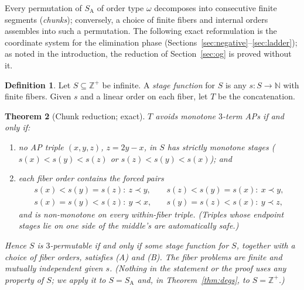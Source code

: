 \documentclass[11pt]{article}
\newtheorem{theorem}{Theorem}
\theoremstyle{definition}
\newtheorem{definition}[theorem]{Definition}
\newcommand{\Z}{\mathbb{Z}}
\newcommand{\N}{\mathbb{N}}
\newcommand{\SA}{S_{\mathrm{A}}}
\begin{document}
Every permutation of $\SA$ of order type $\omega$ decomposes into consecutive
finite segments (\emph{chunks}); conversely, a choice of finite fibers and
internal orders assembles into such a permutation. The following exact
reformulation is the coordinate system for the elimination phase
(Sections~\ref{sec:negative}--\ref{sec:ladder}); as noted in the
introduction, the reduction of Section~\ref{sec:og} is proved without it.

\begin{definition}
Let $S \subseteq \Z^+$ be infinite. A \emph{stage function} for $S$ is any
$s\colon S \to \N$ with finite fibers.
Given $s$ and a linear order on each fiber, let $T$ be the concatenation.
\end{definition}

\begin{theorem}[Chunk reduction; exact]\label{thm:chunk}
$T$ avoids monotone $3$-term APs if and only if:
\begin{enumerate}
\item[(A)] no AP triple $(x,y,z)$, $z=2y-x$, in $S$ has strictly monotone
stages ($s(x)<s(y)<s(z)$ or $s(z)<s(y)<s(x)$); and
\item[(B)] each fiber order contains the \emph{forced pairs}
\[
\begin{array}{ll}
s(x)<s(y)=s(z):\ z \prec y, &\quad s(z)<s(y)=s(x):\ x \prec y,\\
s(x)=s(y)<s(z):\ y \prec x, &\quad s(y)=s(z)<s(x):\ y \prec z,
\end{array}
\]
and is non-monotone on every within-fiber triple. (Triples whose endpoint
stages lie on one side of the middle's are automatically safe.)
\end{enumerate}
Hence $S$ is $3$-permutable if and only if some stage function for $S$,
together with a choice of fiber orders, satisfies
(A) and (B). The fiber problems are finite and mutually independent given
$s$. (Nothing in the statement or the proof uses any property of $S$; we
apply it to $S = \SA$ and, in Theorem~\ref{thm:degs}, to $S = \Z^+$.)
\end{theorem}
\end{document}
